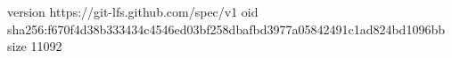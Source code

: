 version https://git-lfs.github.com/spec/v1
oid sha256:f670f4d38b333434c4546ed03bf258dbafbd3977a05842491c1ad824bd1096bb
size 11092
